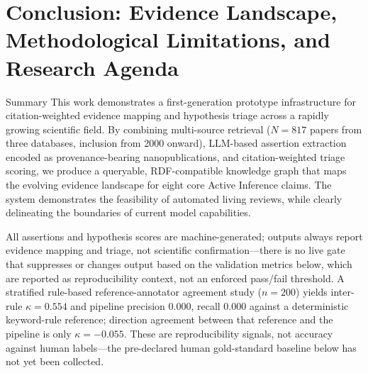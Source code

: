 \documentclass[
  ignorenonframetext,
]{beamer}
\author{\texorpdfstring{}{}}
\date{}
\begin{document}
\section{\texorpdfstring{Conclusion: Evidence Landscape, Methodological
Limitations, and Research Agenda
\label{sec:conclusion}}{Conclusion: Evidence Landscape, Methodological Limitations, and Research Agenda }}\label{conclusion-evidence-landscape-methodological-limitations-and-research-agenda}

\begin{frame}[allowframebreaks]{Summary}
\protect{}\label{summary}
This work demonstrates a first-generation prototype infrastructure for
citation-weighted evidence mapping and hypothesis triage across a
rapidly growing scientific field. By combining multi-source retrieval
(\(N = 817\) papers from three databases, inclusion from 2000 onward),
LLM-based assertion extraction encoded as provenance-bearing
nanopublications, and citation-weighted triage scoring, we produce a
queryable, RDF-compatible knowledge graph that maps the evolving
evidence landscape for eight core Active Inference claims. The system
demonstrates the feasibility of automated living reviews, while clearly
delineating the boundaries of current model capabilities.

All assertions and hypothesis scores are machine-generated; outputs
always report evidence mapping and triage, not scientific
confirmation---there is no live gate that suppresses or changes output
based on the validation metrics below, which are reported as
reproducibility context, not an enforced pass/fail threshold. A
stratified rule-based reference-annotator agreement study (\(n = 200\))
yields inter-rule \(\kappa = 0.554\) and pipeline precision 0.000,
recall 0.000 against a deterministic keyword-rule reference; direction
agreement between that reference and the pipeline is only
\(\kappa = -0.055\). These are reproducibility signals, not accuracy
against human labels---the pre-declared human gold-standard baseline
below has not yet been collected.
\end{frame}
\end{document}
